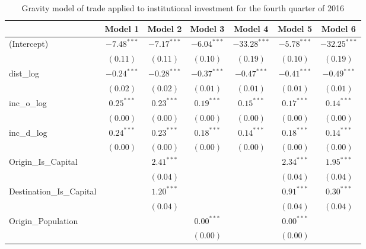 \begin{table}
	\begin{center}
		\small
		\caption[CGravity Model of Trade for Q4 2016]{Gravity model of trade applied to institutional investment for the fourth quarter of 2016}
		\begin{tabular}{l c c c c c c }
			\hline
			& Model 1 & Model 2 & Model 3 & Model 4 & Model 5 & Model 6 \\
			\hline
			(Intercept)                  & $-7.48^{***}$ & $-7.17^{***}$ & $-6.04^{***}$ & $-33.28^{***}$ & $-5.78^{***}$ & $-32.25^{***}$ \\
			& $(0.11)$      & $(0.11)$      & $(0.10)$      & $(0.19)$       & $(0.10)$      & $(0.19)$       \\
			dist\_log                    & $-0.24^{***}$ & $-0.28^{***}$ & $-0.37^{***}$ & $-0.47^{***}$  & $-0.41^{***}$ & $-0.49^{***}$  \\
			& $(0.02)$      & $(0.02)$      & $(0.01)$      & $(0.01)$       & $(0.01)$      & $(0.01)$       \\
			inc\_o\_log                  & $0.25^{***}$  & $0.23^{***}$  & $0.19^{***}$  & $0.15^{***}$   & $0.17^{***}$  & $0.14^{***}$   \\
			& $(0.00)$      & $(0.00)$      & $(0.00)$      & $(0.00)$       & $(0.00)$      & $(0.00)$       \\
			inc\_d\_log                  & $0.24^{***}$  & $0.23^{***}$  & $0.18^{***}$  & $0.14^{***}$   & $0.18^{***}$  & $0.14^{***}$   \\
			& $(0.00)$      & $(0.00)$      & $(0.00)$      & $(0.00)$       & $(0.00)$      & $(0.00)$       \\
			Origin\_Is\_Capital          &               & $2.41^{***}$  &               &                & $2.34^{***}$  & $1.95^{***}$   \\
			&               & $(0.04)$      &               &                & $(0.04)$      & $(0.04)$       \\
			Destination\_Is\_Capital     &               & $1.20^{***}$  &               &                & $0.91^{***}$  & $0.30^{***}$   \\
			&               & $(0.04)$      &               &                & $(0.04)$      & $(0.04)$       \\
			Origin\_Population           &               &               & $0.00^{***}$  &                & $0.00^{***}$  &                \\
			&               &               & $(0.00)$      &                & $(0.00)$      &                \\

\end{tabular}
\end{center}
\end{table}
